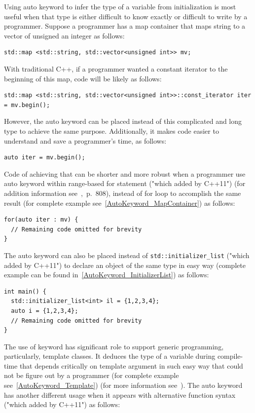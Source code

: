 \documentclass[11pt]{report}
\begin{document}
Using auto keyword to infer the type of a variable from initialization is most useful when that type is either difficult to know exactly or difficult to write by a programmer. Suppose a programmer has a map container that maps string to a vector of unsigned an integer as follows: 
\begin{lstlisting}
std::map <std::string, std::vector<unsigned int>> mv;
\end{lstlisting}
With traditional C++, if a programmer wanted a constant iterator to the beginning of this map, code will be likely as follows:
\begin{lstlisting}
std::map <std::string, std::vector<unsigned int>>::const_iterator iter = mv.begin();
\end{lstlisting}
However, the auto keyword can be placed instead of this complicated and long type to achieve the same purpose. Additionally, it makes code easier to understand and save a programmer's time, as follows:
\begin{lstlisting}
auto iter = mv.begin();
\end{lstlisting}
Code of achieving that can be shorter and more robust when a programmer use auto keyword within range-based for statement ("which added by C++11") (for addition information see~\cite{Horstmann:2008:BC},~p.~808), instead of for loop to accomplish the same result (for complete example see~\ref{AutoKeyword_MapContainer}) as follows: 
\begin{lstlisting}
for(auto iter : mv) {
  // Remaining code omitted for brevity
}
\end{lstlisting}
The auto keyword can also be placed instead of \texttt{std::initializer\_list} ("which added by C++11") to declare an object of the same type in easy way (complete example can be found in~\ref{AutoKeyword_InitializerList}) as follows:
\begin{lstlisting}
int main() {
  std::initializer_list<int> il = {1,2,3,4};
  auto i = {1,2,3,4};
  // Remaining code omitted for brevity
}
\end{lstlisting}
The use of keyword has significant role to support generic programming, particularly, template classes. It deduces the type of a variable  during compile-time that depends critically on template argument in such easy way that could not be figure out by a programmer (for complete example see~\ref{AutoKeyword_Template}) (for more information see~\cite{Stroustrup:2012:Cpp11}). The auto keyword has another different usage when it appears with alternative function syntax ("which added by C++11") as follows:
\end{document}
